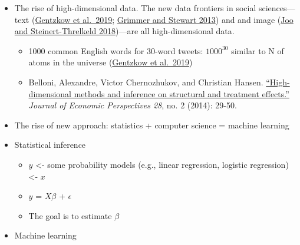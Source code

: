 \documentclass[
]{book}
\begin{document}
\begin{itemize}
\item
  The rise of high-dimensional data. The new data frontiers in social sciences---text (\href{https://web.stanford.edu/~gentzkow/research/text-as-data.pdf}{Gentzkow et al.~2019}; \href{https://www.jstor.org/stable/pdf/24572662.pdf?casa_token=SQdSI4R_VdwAAAAA:4QiVLhCXqr9f0qNMM9U75EL5JbDxxnXxUxyIfDf0U8ZzQx9szc0xVqaU6DXG4nHyZiNkvcwGlgD6H0Lxj3y0ULHwgkf1MZt8-9TPVtkEH9I4AHgbTg}{Grimmer and Stewart 2013}) and and image (\href{https://arxiv.org/pdf/1810.01544}{Joo and Steinert-Threlkeld 2018})---are all high-dimensional data.

  \begin{itemize}
  \item
    1000 common English words for 30-word tweets: \(1000^{30}\) similar to N of atoms in the universe (\href{https://web.stanford.edu/~gentzkow/research/text-as-data.pdf}{Gentzkow et al.~2019})
  \item
    Belloni, Alexandre, Victor Chernozhukov, and Christian Hansen. \href{https://pubs.aeaweb.org/doi/pdfplus/10.1257/jep.28.2.29}{``High-dimensional methods and inference on structural and treatment effects.''} \emph{Journal of Economic Perspectives 28}, no. 2 (2014): 29-50.
  \end{itemize}
\item
  The rise of new approach: statistics + computer science = machine learning
\item
  Statistical inference

  \begin{itemize}
  \item
    \(y\) \textless- some probability models (e.g., linear regression, logistic regression) \textless- \(x\)
  \item
    \(y\) = \(X\beta\) + \(\epsilon\)
  \item
    The goal is to estimate \(\beta\)
  \end{itemize}
\item
  Machine learning


\end{itemize}
\end{document}
